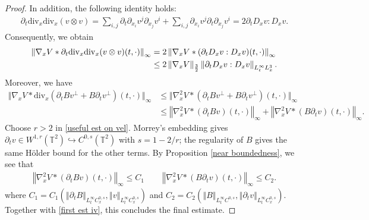 \documentclass[11pt,reqno]{amsart}
\numberwithin{equation}{section}
\begin{document}
\begin{proof}
In addition, the following identity holds: 
\begin{align*}
\partial_{t}\mathrm{div}_{x}\mathrm{div}_{x}(v\otimes v)=\sum_{i,j}\partial_{t}\partial_{x_{i}}v^{j}\partial_{x_{j}}v^{i}+\sum_{i,j}\partial_{x_{i}}v^{j}\partial_{t}\partial_{x_{j}}v^{i}=2\partial_{t}D_{x}v:D_{x}v.   
\end{align*}
Consequently, we obtain  
\begin{align}
\left\Vert \nabla_{x}V\ast \partial_{t}\mathrm{div}_{x}\mathrm{div}_{x}(v\otimes v)(t,\cdot)\right\Vert_{\infty}&=2\left\Vert \nabla_{x}V\ast (\partial_{t}D_{x}v:D_{x}v)(t,\cdot)\right\Vert_{\infty} \notag\\
&\leq 2\left\Vert \nabla_{x}V\right\Vert_{\frac{3}{2}}\left\Vert \partial_{t}D_{x}v:D_{x}v\right\Vert_{L^{\infty}_{t}L^{3}_{x}}. \label{first est iv}       
\end{align}
Moreover, we have 
\begin{align*}
\big\Vert \nabla_{x}V\ast\mathrm{div}_{x}(\partial_{t}Bv^{\perp}+B\partial_{t}v^{\perp})(t,\cdot)\big\Vert_{\infty}
&\leq \big\Vert \nabla_{x}^{2}V\ast (\partial_{t}Bv^{\perp}+B\partial_{t}v^{\perp})(t,\cdot)\big\Vert_{\infty}\\
&\leq 
\left\Vert \nabla_{x}^{2}V\ast (\partial_{t}B v)(t,\cdot)\right\Vert_{\infty}+\left\Vert \nabla_{x}^{2}V\ast (B\partial_{t}v)(t,\cdot)\right\Vert_{\infty}.   
\end{align*}
Choose $r>2$ in \eqref{useful est on vel}.  Morrey's embedding gives
$\partial_t v\in W^{1,r}(\mathbb T^2)\hookrightarrow C^{0,s}(\mathbb T^2)$
with $s=1-2/r$; the regularity of $B$ gives the same H\"{o}lder bound for the other terms.
By Proposition \ref{near boundedness}, we see that
\begin{align*}
\left\Vert \nabla_{x}^{2}V\ast (\partial_{t}B v)(t,\cdot)\right\Vert_{\infty}\leq C_{1}\,\qquad
\left\Vert \nabla_{x}^{2}V\ast (B\partial_{t}v)(t,\cdot)\right\Vert_{\infty}\leq C_{2}.       
\end{align*}
where $C_{1}=C_{1}(\left\Vert \partial_{t}B\right\Vert_{L^{\infty}_{t}C^{0,s}_{x}},\left\Vert v\right\Vert_{L^{\infty}_{t}C^{0,s}_{x}} )$ and $C_{2}=C_{2}(\left\Vert B\right\Vert_{L^{\infty}_{t}C^{0,s}},\left\Vert \partial_{t}v\right\Vert_{L^{\infty}_{t}C^{0,s}_{x}})$. Together with \eqref{first est iv}, this concludes the final estimate.  
\end{proof}
\end{document}
